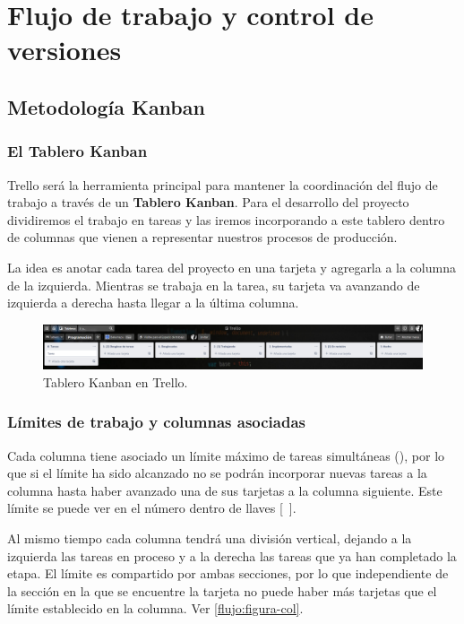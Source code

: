 
\section{Flujo de trabajo y control de versiones}\label{flujo:flujo-de-trabajo}

\subsection{Metodología Kanban}\label{flujo:metodologia-kanban}
\subsubsection{El Tablero Kanban}\label{flujo:tablero-kanban}
Trello será la herramienta principal para mantener la coordinación del flujo de trabajo a través de un \textbf{Tablero Kanban}. Para el desarrollo del proyecto dividiremos el trabajo en tareas y las iremos incorporando a este tablero dentro de columnas que vienen a representar nuestros procesos de producción.

La idea es anotar cada tarea del proyecto en una tarjeta y agregarla a la columna de la izquierda. Mientras se trabaja en la tarea, su tarjeta va avanzando de izquierda a derecha hasta llegar a la última columna.  

\begin{figure}[ht]
	\centering
	\includegraphics[width=\textwidth]{images/tablero01.png}
	\caption{Tablero Kanban en Trello.}
\end{figure}

\subsubsection{Límites de trabajo y columnas asociadas}\label{flujo:limites-de-trabajo}
Cada columna tiene asociado un límite máximo de tareas simultáneas (), por lo que si el límite ha sido alcanzado no se podrán incorporar nuevas tareas a la columna hasta haber avanzado una de sus tarjetas a la columna siguiente. Este límite se puede ver en el número dentro de llaves [~].

Al mismo tiempo cada columna tendrá una división vertical, dejando a la izquierda las tareas en proceso y a la derecha las tareas que ya han completado la etapa. El límite es compartido por ambas secciones, por lo que independiente de la sección en la que se encuentre la tarjeta no puede haber más tarjetas que el límite establecido en la columna. Ver \autoref{flujo:figura-col}.

